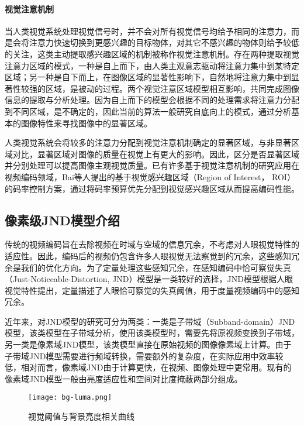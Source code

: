   \paragraph{视觉注意机制} 当人类视觉系统处理视觉信号时，并不会对所有视觉信号均给予相同的注意力，而是会将注意力快速切换到更感兴趣的目标物体，对其它不感兴趣的物体则给予较低的关注，这类主动提取感兴趣区域的机制被称作视觉注意机制\cite{borjiStateoftheArtVisualAttention2013}。存在两种提取视觉注意力区域的模式，一种是自上而下，由人类主观意志驱动将注意力集中到某特定区域；另一种是自下而上，在图像区域的显著性影响下，自然地将注意力集中到显著性较强的区域，是被动的过程。两个视觉注意区域模型相互影响，共同完成图像信息的提取与分析处理。因为自上而下的模型会根据不同的处理需求将注意力分配到不同区域，是不确定的，因此当前的算法一般研究自底向上的模式，通过分析基本的图像特性来寻找图像中的显著区域。

  人类视觉系统会将较多的注意力分配到视觉注意机制确定的显著区域，与非显著区域对比，显著区域对图像的质量在视觉上有更大的影响。因此，区分是否显著区域并分别处理可以提高图像主观视觉质量。已有许多基于视觉注意机制的研究应用在视频编码领域，Bai等人提出的基于视觉感兴趣区域（Region of Interest， ROI）的码率控制方案\cite{baiSaliencyBasedRate2016}，通过将码率预算优先分配到视觉感兴趣区域从而提高编码性能。

  \subsection{像素级JND模型介绍}
  传统的视频编码旨在去除视频在时域与空域的信息冗余，不考虑对人眼视觉特性的适应性。因此，编码后的视频仍包含许多人眼视觉无法察觉到的冗余，这些感知冗余是我们的优化方向。为了定量处理这些感知冗余，在感知编码中恰可察觉失真（Just-Noticeable-Distortion, JND）模型是一类较好的选择，JND模型根据人眼视觉特性提出，定量描述了人眼恰可察觉的失真阈值，用于度量视频编码中的感知冗余。

  近年来，对JND模型的研究可分为两类：一类是子带域（Subband-domain）JND模型，该类模型在子带域分析，使用该类模型时，需要先将原视频变换到子带域，另一类是像素域JND模型，该类模型直接在原始视频的图像像素域上计算。由于子带域JND模型需要进行频域转换，需要额外的复杂度，在实际应用中效率较低，相对而言，像素域JND由于计算更快，在视频、图像处理中更常用。现有的像素域JND模型一般由亮度适应性和空间对比度掩蔽两部分组成。

  \begin{figure}[!htp]
		\centering
		\texttt{[image: bg-luma.png]}
		\caption{视觉阈值与背景亮度相关曲线\cite{chun-hsienchouPerceptuallyTunedSubband1995}}
		\label{fig:bg-luma}
	\end{figure}
